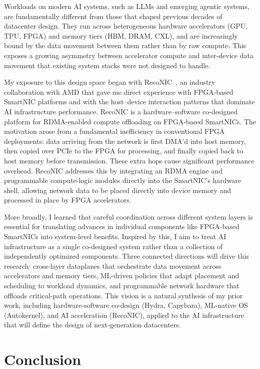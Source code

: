 \documentclass[11pt,letterpaper]{article}
\begin{document}
Workloads on modern AI systems, such as LLMs and emerging agentic systems, are fundamentally different from those that shaped previous decades of datacenter design. They run across heterogeneous hardware accelerators (GPU, TPU, FPGA) and memory tiers (HBM, DRAM, CXL), and are increasingly bound by the data movement between them rather than by raw compute. This exposes a growing asymmetry between accelerator compute and inter-device data movement that existing system stacks were not designed to handle.

My exposure to this design space began with RecoNIC~\cite{reconic}, an industry collaboration with AMD that gave me direct experience with FPGA-based SmartNIC platforms and with the host--device interaction patterns that dominate AI infrastructure performance. RecoNIC is a hardware--software co-designed platform for RDMA-enabled compute offloading on FPGA-based SmartNICs. The motivation arose from a fundamental inefficiency in conventional FPGA deployments: data arriving from the network is first DMA'd into host memory, then copied over PCIe to the FPGA for processing, and finally copied back to host memory before transmission. These extra hops cause significant performance overhead. RecoNIC addresses this by integrating an RDMA engine and programmable compute-logic modules directly into the SmartNIC's hardware shell, allowing network data to be placed directly into device memory and processed in place by FPGA accelerators.

More broadly, I learned that careful coordination across different system layers is essential for translating advances in individual components like FPGA-based SmartNICs into system-level benefits.
Inspired by this, I aim to treat AI infrastructure as a single co-designed system rather than a collection of independently optimized components.
Three connected directions will drive this research: cross-layer dataplanes that orchestrate data movement across accelerators and memory tiers, ML-driven policies that adapt placement and scheduling to workload dynamics, and programmable network hardware that offloads critical-path operations.
This vision is a natural synthesis of my prior work, including hardware-software co-design (Hydra, Capybara), ML-native OS (Autokernel), and AI acceleration (RecoNIC), applied to the AI infrastructure that will define the design of next-generation datacenters.

\section{Conclusion}
\end{document}
